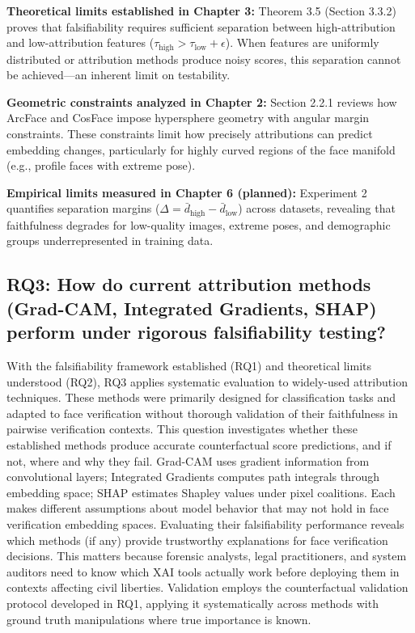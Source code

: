 \vspace{0.3cm}
\noindent\textbf{Theoretical limits established in Chapter 3:} Theorem 3.5 (Section 3.3.2) proves that falsifiability requires sufficient separation between high-attribution and low-attribution features ($\tau_{\text{high}} > \tau_{\text{low}} + \epsilon$). When features are uniformly distributed or attribution methods produce noisy scores, this separation cannot be achieved---an inherent limit on testability.

\vspace{0.3cm}
\noindent\textbf{Geometric constraints analyzed in Chapter 2:} Section 2.2.1 reviews how ArcFace and CosFace impose hypersphere geometry with angular margin constraints. These constraints limit how precisely attributions can predict embedding changes, particularly for highly curved regions of the face manifold (e.g., profile faces with extreme pose).

\vspace{0.3cm}
\noindent\textbf{Empirical limits measured in Chapter 6 (planned):} Experiment 2 quantifies separation margins ($\Delta = \bar{d}_{\text{high}} - \bar{d}_{\text{low}}$) across datasets, revealing that faithfulness degrades for low-quality images, extreme poses, and demographic groups underrepresented in training data.

\subsection*{RQ3: How do current attribution methods (Grad-CAM, Integrated Gradients, SHAP) perform under rigorous falsifiability testing?}

With the falsifiability framework established (RQ1) and theoretical limits understood (RQ2), RQ3 applies systematic evaluation to widely-used attribution techniques. These methods were primarily designed for classification tasks and adapted to face verification without thorough validation of their faithfulness in pairwise verification contexts. This question investigates whether these established methods produce accurate counterfactual score predictions, and if not, where and why they fail. Grad-CAM uses gradient information from convolutional layers; Integrated Gradients computes path integrals through embedding space; SHAP estimates Shapley values under pixel coalitions. Each makes different assumptions about model behavior that may not hold in face verification embedding spaces. Evaluating their falsifiability performance reveals which methods (if any) provide trustworthy explanations for face verification decisions. This matters because forensic analysts, legal practitioners, and system auditors need to know which XAI tools actually work before deploying them in contexts affecting civil liberties. Validation employs the counterfactual validation protocol developed in RQ1, applying it systematically across methods with ground truth manipulations where true importance is known.

